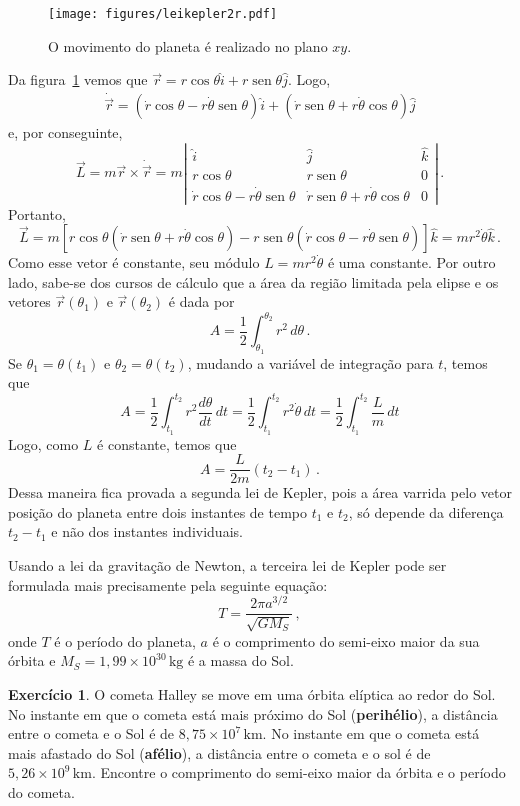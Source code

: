 \documentclass[12pt,a4paper]{article}
\theoremstyle{definition}
\newtheorem{ex}{Exercício}[section]
\DeclareMathOperator{\sen}{sen}
\begin{document}
\begin{figure}[t]
  \centering
  \texttt{[image: figures/leikepler2r.pdf]}
  \caption{O movimento do planeta é realizado no plano $xy$.}
  \label{fig:leikepler2r}
\end{figure}

Da figura~\ref{fig:leikepler2r} vemos que
$\vec r=r\cos\theta\hat i+r\sen\theta\hat j$. Logo,
\begin{equation*}
  \begin{split}
    \dot{\vec r}=(\dot r\cos\theta-r\dot\theta\sen\theta)\hat i+(\dot
    r\sen\theta+r\dot\theta\cos\theta)\hat j
  \end{split}
\end{equation*}
e, por conseguinte,
$$\vec L=m\vec r\times\dot{\vec r}=m\left|
  \begin{array}{ccc}
    \hat i&\hat j&\hat k\\
    r\cos\theta& r\sen\theta& 0\\
    \dot r\cos\theta-r\dot\theta\sen\theta& \dot r\sen\theta+r\dot\theta\cos\theta&0
  \end{array}
  \right|\,.$$
Portanto,
$$\vec L=m[r\cos\theta(\dot r\sen\theta+r\dot\theta\cos\theta)-r\sen\theta(\dot r\cos\theta-r\dot\theta\sen\theta)]\hat k=mr^2\dot\theta\hat k\,.$$
Como esse vetor é constante, seu módulo $L=mr^2\dot\theta$ é uma
constante. Por outro lado, sabe-se dos cursos de cálculo que a área da
região limitada pela elipse e os vetores $\vec r(\theta_1)$ e
$\vec r(\theta_2)$ é dada por
$$A=\frac{1}{2}\int_{\theta_1}^{\theta_2}r^2\,d\theta\,.$$
Se $\theta_1=\theta(t_1)$ e $\theta_2=\theta(t_2)$, mudando a variável
de integração para $t$, temos que
$$A=\frac{1}{2}\int_{t_1}^{t_2}r^2\frac{d\theta}{dt}\,dt=\frac{1}{2}\int_{t_1}^{t_2}r^2\dot\theta\,dt=\frac{1}{2}\int_{t_1}^{t_2}\frac{L}{m}\,dt$$
Logo, como $L$ é constante, temos que
$$A=\frac{L}{2m}(t_2-t_1)\,.$$
Dessa maneira fica provada a segunda lei de Kepler, pois a área
varrida pelo vetor posição do planeta entre dois instantes de tempo
$t_1$ e $t_2$, só depende da diferença $t_2-t_1$ e não dos instantes
individuais.

Usando a lei da gravitação de Newton, a terceira lei de Kepler pode
ser formulada mais precisamente pela seguinte equação:
$$T=\frac{2\pi a^{3/2}}{\sqrt{GM_S}}\,,$$
onde $T$ é o período do planeta, $a$ é o comprimento do semi-eixo
maior da sua órbita e $M_S=1{,}99\times 10^{30}\,\mathrm{kg}$ é a
massa do Sol.

\begin{ex}
  O cometa Halley se move em uma órbita elíptica ao redor do Sol. No
  instante em que o cometa está mais próximo do Sol
  (\textbf{perihélio}), a distância entre o cometa e o Sol é de
  $8{,}75\times 10^7\,\mathrm{km}$. No instante em que o cometa está
  mais afastado do Sol (\textbf{afélio}), a distância entre o cometa e
  o sol é de $5{,}26\times 10^9\,\mathrm{km}$. Encontre o comprimento
  do semi-eixo maior da órbita e o período do cometa.
\end{ex}
\end{document}
